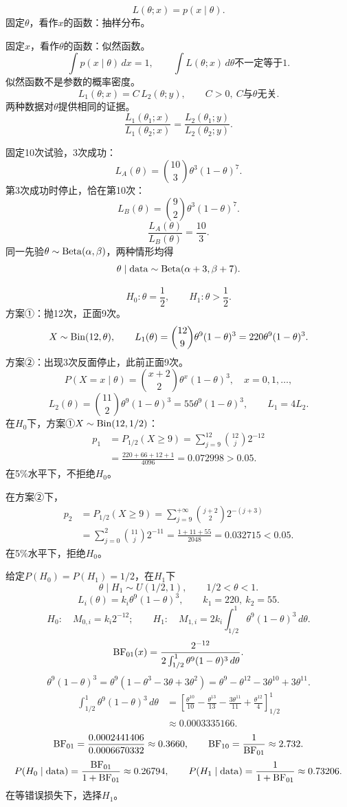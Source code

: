 \[
L(\theta;x)=p(x\mid\theta).
\]
固定$\theta$，看作$x$的函数：抽样分布。

固定$x$，看作$\theta$的函数：似然函数。
\[
\int p(x\mid\theta)\,dx=1,\qquad
\int L(\theta;x)\,d\theta\text{不一定等于}1.
\]
似然函数不是参数的概率密度。
\[
L_1(\theta;x)=C\,L_2(\theta;y),\qquad C>0,\ C\text{与}\theta\text{无关}.
\]
两种数据对$\theta$提供相同的证据。
\[
\frac{L_1(\theta_1;x)}{L_1(\theta_2;x)}
=\frac{L_2(\theta_1;y)}{L_2(\theta_2;y)}.
\]

固定10次试验，3次成功：
\[
L_A(\theta)=\binom{10}{3}\theta^3(1-\theta)^7.
\]
第3次成功时停止，恰在第10次：
\[
L_B(\theta)=\binom92\theta^3(1-\theta)^7.
\]
\[
\frac{L_A(\theta)}{L_B(\theta)}=\frac{10}{3}.
\]
同一先验$\theta\sim\operatorname{Beta}(\alpha,\beta)$，两种情形均得
\[
\theta\mid\mathrm{data}\sim\operatorname{Beta}(\alpha+3,\beta+7).
\]

\[
H_0:\theta=\frac12,\qquad H_1:\theta>\frac12.
\]
方案①：抛12次，正面9次。
\[
X\sim\operatorname{Bin}(12,\theta),\qquad
L_1(\theta)=\binom{12}{9}\theta^9(1-\theta)^3
=220\theta^9(1-\theta)^3.
\]
方案②：出现3次反面停止，此前正面9次。
\[
P(X=x\mid\theta)=\binom{x+2}{2}\theta^x(1-\theta)^3,\quad x=0,1,\ldots,
\]
\[
L_2(\theta)=\binom{11}{2}\theta^9(1-\theta)^3
=55\theta^9(1-\theta)^3,\qquad L_1=4L_2.
\]
在$H_0$下，方案①$X\sim\operatorname{Bin}(12,1/2)$：
\begin{align*}
p_1&=P_{1/2}(X\geq9)
=\sum_{j=9}^{12}\binom{12}{j}2^{-12}\\
&=\frac{220+66+12+1}{4096}=0.072998>0.05.
\end{align*}
在5\%水平下，不拒绝$H_0$。

在方案②下，
\begin{align*}
p_2&=P_{1/2}(X\geq9)
=\sum_{j=9}^{+\infty}\binom{j+2}{2}2^{-(j+3)}\\
&=\sum_{j=0}^2\binom{11}{j}2^{-11}
=\frac{1+11+55}{2048}=0.032715<0.05.
\end{align*}
在5\%水平下，拒绝$H_0$。

给定$P(H_0)=P(H_1)=1/2$，在$H_1$下
\[
\theta\mid H_1\sim U(1/2,1),\qquad 1/2<\theta<1.
\]
\[
L_i(\theta)=k_i\theta^9(1-\theta)^3,\qquad k_1=220,\ k_2=55.
\]
\[
H_0:\quad M_{0,i}=k_i2^{-12};\qquad
H_1:\quad M_{1,i}=2k_i\int_{1/2}^1\theta^9(1-\theta)^3\,d\theta.
\]
\[
\operatorname{BF}_{01}(x)=
\frac{2^{-12}}{2\int_{1/2}^1\theta^9(1-\theta)^3\,d\theta}.
\]
\[
\theta^9(1-\theta)^3
=\theta^9(1-\theta^3-3\theta+3\theta^2)
=\theta^9-\theta^{12}-3\theta^{10}+3\theta^{11}.
\]
\begin{align*}
\int_{1/2}^1\theta^9(1-\theta)^3\,d\theta
&=\left[\frac{\theta^{10}}{10}-\frac{\theta^{13}}{13}
-\frac{3\theta^{11}}{11}+\frac{\theta^{12}}4\right]_{1/2}^1\\
&\approx0.0003335166.
\end{align*}
\[
\operatorname{BF}_{01}=\frac{0.0002441406}{0.0006670332}\approx0.3660,
\qquad\operatorname{BF}_{10}=\frac1{\operatorname{BF}_{01}}\approx2.732.
\]
\[
P(H_0\mid\mathrm{data})=\frac{\operatorname{BF}_{01}}{1+\operatorname{BF}_{01}}\approx0.26794,
\qquad
P(H_1\mid\mathrm{data})=\frac1{1+\operatorname{BF}_{01}}\approx0.73206.
\]
在等错误损失下，选择$H_1$。

